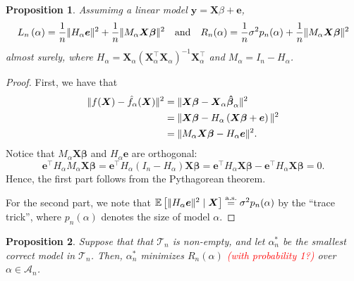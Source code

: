 \documentclass[12pt, letter paper]{article}
\newcommand{\1}{\mathmybb{1}}
\newtheorem{proposition}{Proposition}[section]
\newcommand{\0}{\emptyset}
\newcommand{\Ep}[1]{\mathbb{E}\left[ #1 \right]}
\newcommand{\paren}[1]{\left(#1 \right)}
\newcommand{\norm}[1]{|\hspace{-1pt}|#1 |\hspace{-1pt}|}
\newcommand{\normsq}[1]{\norm{#1}^{2}}
\newcommand{\Acal}{\mathcal{A}_{n}}
\newcommand{\Tcal}{\mathcal{T}_{n}}
\newcommand{\aseq}{\stackrel{\mathrm{a.s.}}{=}}
\newcommand{\X}{\boldsymbol{X}}
\newcommand{\y}{\boldsymbol{y}}
\newcommand{\e}{\boldsymbol{e}}
\newcommand{\bbeta}{\boldsymbol{\beta}}
\newcommand{\bbetahat}{\boldsymbol{\hat{\beta}}}
\newcommand{\Loss}[1]{L_{n}\paren{#1}}
\begin{document}
\begin{proposition}
    Assumimg a linear model \(\y = \X\beta + \e\),
    \[\Loss{\alpha} = \frac{1}{n}\normsq{H_{\alpha}\e} + \frac{1}{n}\normsq{M_{\alpha}\X\bbeta}\quad\text{and}\quad R_{n}(\alpha) = \frac{1}{n}\sigma^{2}p_{n}(\alpha) + \frac{1}{n}\normsq{M_{\alpha}\X\bbeta}\]
    almost surely, where \(H_{\alpha} = \X_{\alpha}\paren{\X_{\alpha}^{\top}\X_{\alpha}}^{-1}\X_{\alpha}^{\top}\) and \(M_{\alpha}= I_{n} - H_{\alpha}\).
\end{proposition}

\begin{proof}
    First, we have that
    \begin{align*}
        \normsq{f(\X) - \hat{f}_{\alpha}(\X)} &= \normsq{\X\bbeta - \X_{\alpha}\bbetahat_{\alpha}}\\
        &= \normsq{\X\bbeta - H_{\alpha}\paren{\X\bbeta + \e}}\\
        &= \normsq{M_{\alpha}\X\bbeta - H_{\alpha}\e}.
    \end{align*}
    Notice that \(M_{\alpha}\X\bbeta\) and \(H_{\alpha}\e\) are orthogonal:
    \[\e^{\top}H_{\alpha}M_{\alpha}\X\bbeta  = \e^{\top}H_{\alpha}\paren{I_{n} - H_{\alpha}}\X\bbeta = \e^{\top}H_{\alpha}\X\bbeta - \e^{\top}H_{\alpha}\X\bbeta = 0.\]
    Hence, the first part follows from the Pythagorean theorem.

    For the second part, we note that \(\Ep{\normsq{H_{\alpha}\e}\mid\X} \aseq \sigma^{2}p_{n}(\alpha)\) by the ``trace trick'', where \(p_{n}(\alpha)\) denotes the size of model \(\alpha\).
\end{proof}

\begin{proposition}\label{prop:Ropt}
    Suppose that that \(\Tcal\) is non-empty, and let \(\alpha^{*}_{n}\) be the smallest correct model in \(\Tcal\). Then, \(\alpha^{*}_{n}\) minimizes \(R_{n}(\alpha)\) \textcolor{red}{(with probability 1?)} over \(\alpha\in\Acal\).
\end{proposition}
\end{document}
